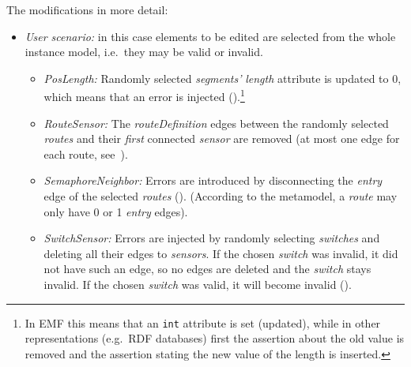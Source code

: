 The modifications in more detail:
\begin{itemize}
  \item \emph{User scenario:} in this case elements to be edited are selected from the whole instance model, i.e.\ they may be valid or invalid. 
  \begin{itemize}
    
    \item \emph{PosLength:} Randomly selected \emph{segments'} \emph{length} attribute is updated to 0, which means that an error is injected ().\footnote{In EMF this means that an \texttt{int} attribute is set (updated), while in other representations (e.g.\ RDF databases) first the assertion about the old value is removed and the assertion stating the new value of the length is inserted.}
    
    \item \emph{RouteSensor:} The \emph{routeDefinition} edges between the randomly selected \emph{routes} and their \emph{first} connected \emph{sensor} are removed (at most one edge for each route, see~).
    
    \item \emph{SemaphoreNeighbor:} Errors are introduced by disconnecting the \emph{entry} edge of the selected \emph{routes} (). (According to the metamodel, a \emph{route} may only have 0 or 1 \emph{entry} edges).

    \item \emph{SwitchSensor:} Errors are injected by randomly selecting \emph{switches} and deleting all their edges to \emph{sensors}. If the chosen \emph{switch} was invalid, it did not have such an edge, so no edges are deleted and the \emph{switch} stays invalid. If the chosen \emph{switch} was valid, it will become invalid ().
        
\end{itemize}
  

\end{itemize}
